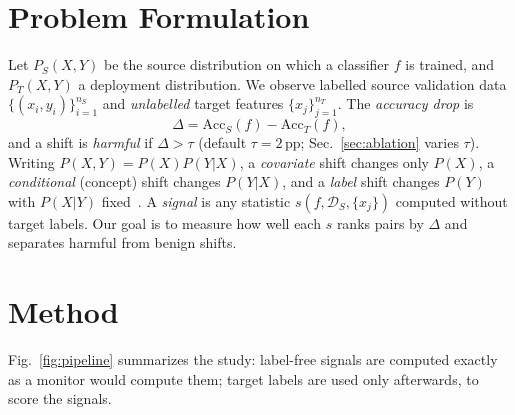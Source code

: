 \documentclass[conference]{IEEEtran}
\theoremstyle{plainhead}
\newcommand{\pp}{\,pp}
\begin{document}
\section{Problem Formulation}
Let $P_S(X,Y)$ be the source distribution on which a classifier $f$ is trained, and $P_T(X,Y)$ a deployment distribution. We observe labelled source validation data $\{(x_i,y_i)\}_{i=1}^{n_S}$ and \emph{unlabelled} target features $\{x_j\}_{j=1}^{n_T}$. The \textit{accuracy drop} is
\begin{equation}
\Delta = \mathrm{Acc}_S(f) - \mathrm{Acc}_T(f),
\end{equation}
and a shift is \textit{harmful} if $\Delta>\tau$ (default $\tau = 2$\pp; Sec.~\ref{sec:ablation} varies $\tau$). Writing $P(X,Y)=P(X)P(Y|X)$, a \emph{covariate} shift changes only $P(X)$, a \emph{conditional} (concept) shift changes $P(Y|X)$, and a \emph{label} shift changes $P(Y)$ with $P(X|Y)$ fixed~\cite{moreno2012unifying,lipton2018bbse}. A \textit{signal} is any statistic $s(f,\mathcal{D}_S,\{x_j\})$ computed without target labels. Our goal is to measure how well each $s$ ranks pairs by $\Delta$ and separates harmful from benign shifts.

\section{Method}
Fig.~\ref{fig:pipeline} summarizes the study: label-free signals are computed exactly as a monitor would compute them; target labels are used only afterwards, to score the signals.
\end{document}
